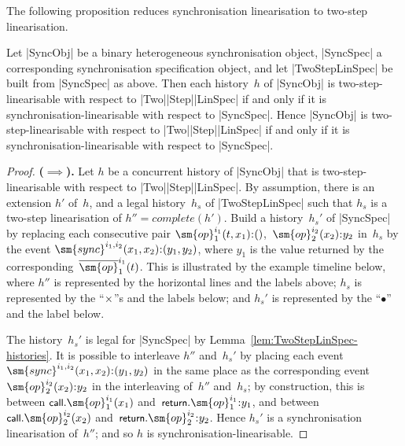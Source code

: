 The following proposition reduces synchronisation linearisation to two-step
linearisation.
%
\begin{prop}
\label{prop:two-step-lin}
Let |SyncObj| be a binary heterogeneous synchronisation object, |SyncSpec| a
corresponding synchronisation specification object, and let |TwoStepLinSpec|
be built from |SyncSpec| as above.  Then each history~$h$ of |SyncObj| is
two-step-linearisable with respect to |Two|\-|Step|\-|LinSpec| if and only if
it is synchronisation-linearisable with respect to |SyncSpec|.  Hence
|SyncObj| is two-step-linearisable with respect to |Two|\-|Step|\-|LinSpec| if
and only if it is synchronisation-linearisable with respect to |SyncSpec|.
\end{prop}
\begin{proof}
\textbf{($\implies$).}\quad
%
Let $h$ be a concurrent history of |SyncObj| that is two-step-linearisable
with respect to |Two|\-|Step|\-|LinSpec|.  By assumption, there is an
extension $h'$ of~$h$, and a legal history~$h_s$ of |TwoStepLinSpec| such that
$h_s$ is a  two-step linearisation of $h'' = complete(h')$.
%
Build a history~$h_s'$ of |SyncSpec| by replacing each consecutive pair
$\sm{op}_1^{i_1}(t,x_1) \:: ()$,\, $\sm{op}_2^{i_2}(x_2) \:: y_2$ in~$h_s$ by
the event $\sm{sync}^{i_1,i_2}(x_1,x_2) \:: (y_1,y_2)$, where $y_1$ is the
value returned by the corresponding~$\overline{\sm{op}}_1^{i_1}(t)$.
%
This is illustrated by the example timeline below, where $h''$ is represented
by the horizontal lines and the labels above; $h_s$ is represented by the
``$\times$''s and the labels below; and $h_s'$ is represented by the
``$\bullet$'' and the label below.
%
\begin{center}
\end{center}

The history~$h_s'$ is legal for |SyncSpec| by
Lemma~\ref{lem:TwoStepLinSpec-histories}.
%
It is possible to interleave $h''$ and~$h_s'$ by placing each event
$\sm{sync}^{i_1,i_2}(x_1,x_2) \:: (y_1,y_2)$ in the same place as the
corresponding event $\sm{op}_2^{i_2}(x_2) \:: y_2$ in the interleaving
of~$h''$ and~$h_s$; by construction, this is between
$\call.\sm{op}_1^{i_1}(x_1)$ and~$\return.\sm{op}_1^{i_1} \:: y_1$, and
between $\call.\sm{op}_2^{i_2}(x_2)$ and~$\return.\sm{op}_2^{i_2} \:: y_2$.
%
Hence $h_s'$ is a synchronisation linearisation of~$h''$; and so $h$ is
synchronisation-linearisable.


\end{proof}
